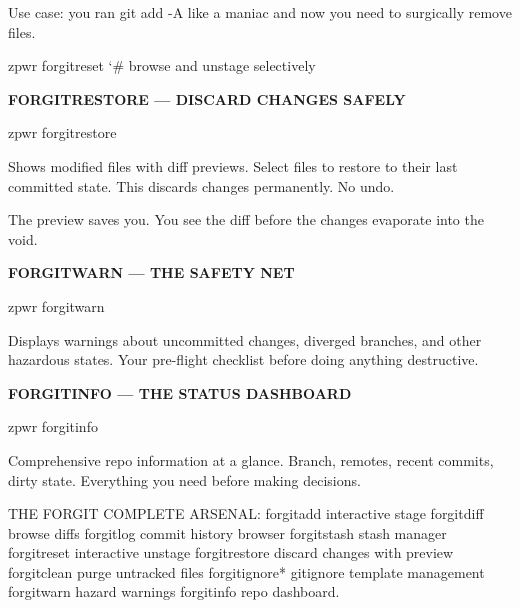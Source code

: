 \documentclass[11pt,a4paper,twoside]{book}
\begin{document}
Use case: you ran git add -A like a maniac and now you need to surgically remove files.

\begin{codebox}
\color{neongreen}zpwr forgitreset    {\char`\#} browse and unstage selectively\\
\end{codebox}


\vspace{12pt}
{\bfseries\color{neonyellow} FORGITRESTORE — DISCARD CHANGES SAFELY}\vspace{4pt}

\begin{codebox}
\color{neongreen}zpwr forgitrestore\\
\end{codebox}

Shows modified files with diff previews. Select files to restore to their last committed state. This discards changes permanently. No undo.

The preview saves you. You see the diff before the changes evaporate into the void.


\vspace{12pt}
{\bfseries\color{neonyellow} FORGITWARN — THE SAFETY NET}\vspace{4pt}

\begin{codebox}
\color{neongreen}zpwr forgitwarn\\
\end{codebox}

Displays warnings about uncommitted changes, diverged branches, and other hazardous states. Your pre-flight checklist before doing anything destructive.


\vspace{12pt}
{\bfseries\color{neonyellow} FORGITINFO — THE STATUS DASHBOARD}\vspace{4pt}

\begin{codebox}
\color{neongreen}zpwr forgitinfo\\
\end{codebox}

Comprehensive repo information at a glance. Branch, remotes, recent commits, dirty state. Everything you need before making decisions.

THE FORGIT COMPLETE ARSENAL: forgitadd        interactive stage forgitdiff       browse diffs forgitlog        commit history browser forgitstash      stash manager forgitreset      interactive unstage forgitrestore    discard changes with preview forgitclean      purge untracked files forgitignore*    gitignore template management forgitwarn       hazard warnings forgitinfo       repo dashboard.
\end{document}
